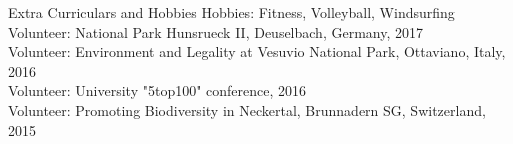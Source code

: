 \documentclass{resume} %
\begin{document}
\begin{rSection}{Extra Curriculars and Hobbies}
{Hobbies: Fitness, Volleyball, Windsurfing}\\
{Volunteer: National Park Hunsrueck II, Deuselbach, Germany, 2017}\\
{Volunteer: Environment and Legality at Vesuvio National Park, Ottaviano, Italy, 2016}\\
{Volunteer: University "5top100" conference, 2016}\\
{Volunteer: Promoting Biodiversity in Neckertal, Brunnadern SG, Switzerland, 2015}
\end{rSection}


\end{document}
